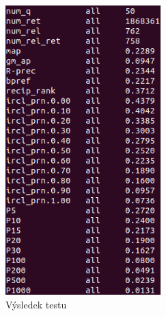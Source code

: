 \documentclass[12pt, a4paper]{article}
\begin{document}
\begin{figure}[h]
	\centering
	\includegraphics[width=6cm]{img/evaluation.png}
	\caption{Výsledek testu}
	\label{fig:evaluation}
\end{figure}
\end{document}
